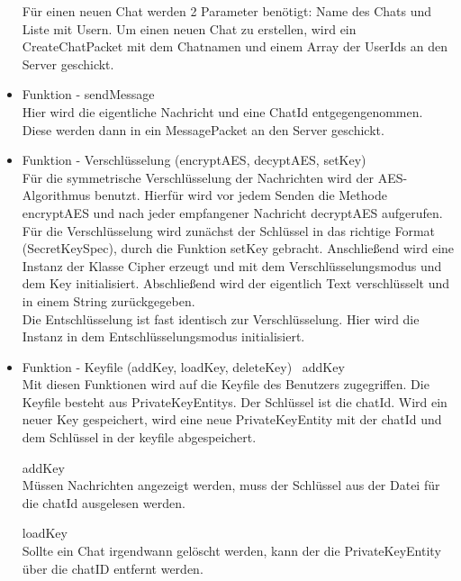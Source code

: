 \begin{itemize}
    Für einen neuen Chat werden 2 Parameter benötigt: Name des Chats und Liste mit Usern. Um einen neuen Chat zu
    erstellen, wird ein CreateChatPacket mit dem Chatnamen und einem Array der UserIds an den Server geschickt.
    
    \item Funktion - sendMessage\\
    Hier wird die eigentliche Nachricht und eine ChatId entgegengenommen. Diese werden dann in ein MessagePacket an
    den Server geschickt.
    
    \item Funktion - Verschlüsselung (encryptAES, decyptAES, setKey) \\
    Für die symmetrische Verschlüsselung der Nachrichten wird der AES-Algorithmus benutzt. Hierfür wird vor jedem Senden
    die Methode encryptAES und nach jeder empfangener Nachricht decryptAES aufgerufen.\\
    Für die Verschlüsselung wird zunächst der Schlüssel in das richtige Format (SecretKeySpec), durch die Funktion
    setKey gebracht. Anschließend wird eine Instanz der Klasse Cipher erzeugt und mit dem Verschlüsselungsmodus und
    dem Key initialisiert. Abschließend wird der eigentlich Text verschlüsselt und in einem String zurückgegeben. \\
    Die Entschlüsselung ist fast identisch zur Verschlüsselung. Hier wird die Instanz in dem Entschlüsselungsmodus
    initialisiert.
    
    \item Funktion - Keyfile (addKey, loadKey, deleteKey) \
    addKey\\
    Mit diesen Funktionen wird auf die Keyfile des Benutzers zugegriffen. Die Keyfile besteht aus PrivateKeyEntitys.
    Der Schlüssel ist die chatId.
    Wird ein neuer Key gespeichert, wird eine neue PrivateKeyEntity mit der chatId und dem Schlüssel in der keyfile
    abgespeichert.
    
    addKey\\
    Müssen Nachrichten angezeigt werden, muss der Schlüssel aus der Datei für die chatId ausgelesen werden.
    
    loadKey \\
    Sollte ein Chat irgendwann gelöscht werden, kann der die PrivateKeyEntity über die chatID entfernt werden. 
    

\end{itemize}
